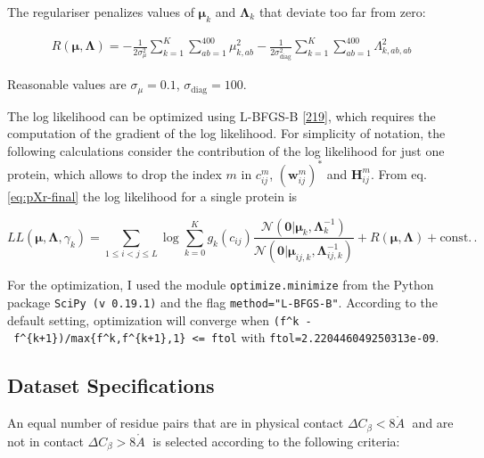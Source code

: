 \documentclass[11pt,a4paper,twoside]{book}
\newcommand{\Cb}{C_\beta}
\newcommand{\Gauss}{\mathcal{N}}
\renewcommand{\H}{\mathbf{H}}
\newcommand{\Hij}{\H_{ij}}
\newcommand{\Lijk}{\mathbf{\Lambda}_{ij,k}}
\newcommand{\Lk}{\mathbf{\Lambda}_k}
\newcommand{\muijk}{\mathbf{\mu}_{ij,k}}
\newcommand{\muk}{\mathbf{\mu}_k}
\newcommand{\cij}{c_{ij}}
\newcommand{\wij}{\mathbf{w}_{ij}}
\newcommand{\angstrom}{\mathring{A} \;}
\theoremstyle{definition}
\theoremstyle{definition}
\theoremstyle{remark}
\begin{document}
The regulariser penalizes values of \(\muk\) and \(\Lk\) that deviate
too far from zero:

\begin{align}
    R(\mathbf{\mu}, \mathbf{\Lambda}) = -\frac{1}{2 \sigma_{\mu}^2} \sum_{k=1}^K \sum_{ab=1}^{400} \mu_{k,ab}^2 
                        -\frac{1}{2 \sigma_\text{diag}^2} \sum_{k=1}^K \sum_{ab=1}^{400} \Lambda_{k,ab,ab}^2
\label{eq:reg}
\end{align}

Reasonable values are \(\sigma_{\mu}=0.1\),
\(\sigma_\text{diag} = 100\).

The log likelihood can be optimized using L-BFGS-B
{[}\protect\hyperlink{ref-Byrd1995}{219}{]}, which requires the
computation of the gradient of the log likelihood. For simplicity of
notation, the following calculations consider the contribution of the
log likelihood for just one protein, which allows to drop the index
\(m\) in \(\cij^m\), \((\wij^m)^*\) and \(\Hij^m\). From eq.
\eqref{eq:pXr-final} the log likelihood for a single protein is

\begin{equation}
    L\!L(\mathbf{\mu}, \mathbf{\Lambda}, \gamma_k) =  \sum_{1 \le i < j \le L}  \log \sum_{k=0}^K g_{k}(\cij) \frac{\Gauss( \mathbf{0} | \muk, \Lk^{-1})}{\Gauss(\mathbf{0} | \muijk, \Lijk^{-1})}  + R(\mathbf{\mu}, \mathbf{\Lambda}) + \text{const.}\,.
\label{eq:ll-coupling-prior}
\end{equation}

For the optimization, I used the module \texttt{optimize.minimize} from
the Python package \texttt{SciPy\ (v\ 0.19.1)} and the flag
\texttt{method="L-BFGS-B"}. According to the default setting,
optimization will converge when
\texttt{(f\^{}k\ -\ f\^{}\{k+1\})/max\{\textbar{}f\^{}k\textbar{},\textbar{}f\^{}\{k+1\}\textbar{},1\}\ \textless{}=\ ftol}
with \texttt{ftol=2.220446049250313e-09}.

\subsection{Dataset
Specifications}\label{dataset-training-hyperparmeters}

An equal number of residue pairs that are in physical contact
\(\Delta\Cb <8 \angstrom\) and are not in contact
\(\Delta\Cb >8 \angstrom\) is selected according to the following
criteria:
\end{document}
